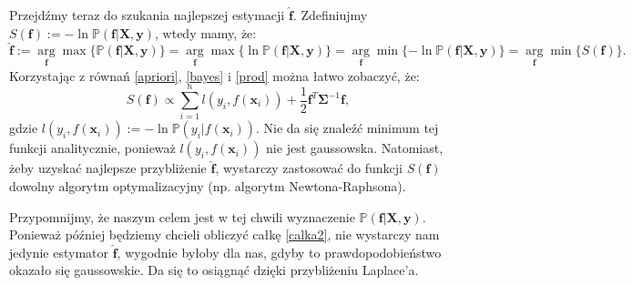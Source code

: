 \documentclass{mini}
\newcommand{\argmin}{\arg\!\min}
\newcommand{\argmax}{\arg\!\max}
\begin{document}
Przejdźmy teraz do szukania najlepszej estymacji $\mathbf{\hat{f}}$. Zdefiniujmy $S(\mathbf{f}) := -\ln\mathbb{P}(\mathbf{f}|\mathbf{X}, \mathbf{y})$, wtedy mamy, że: 
$$
\mathbf{\hat{f}} 
:= \underset{\mathbf{f}}\argmax \lbrace \mathbb{P}(\mathbf{f}|\mathbf{X}, \mathbf{y}) \rbrace 
= \underset{\mathbf{f}}\argmax \lbrace \ln\mathbb{P}(\mathbf{f}|\mathbf{X}, \mathbf{y}) \rbrace
= \underset{\mathbf{f}}\argmin \lbrace -\ln\mathbb{P}(\mathbf{f}|\mathbf{X}, \mathbf{y}) \rbrace
= \underset{\mathbf{f}}\argmin \lbrace S(\mathbf{f}) \rbrace.
$$
Korzystając z równań \eqref{apriori}, \eqref{bayes} i \eqref{prod} można łatwo zobaczyć, że:
$$
S(\mathbf{f}) \propto 
\sum_{i=1}^n\textit{l}(y_i, f(\mathbf{x}_i)) + \frac{1}{2}\mathbf{f}^T\mathbf{\Sigma}^{-1}\mathbf{f},
$$
gdzie $\textit{l}(y_i, f(\mathbf{x}_i)) := -\ln\mathbb{P}(y_i | f(\mathbf{x}_i))$.
Nie da się znaleźć minimum tej funkcji analitycznie, ponieważ $\textit{l}(y_i, f(\mathbf{x}_i))$ nie jest gaussowska. Natomiast, żeby uzyskać najlepsze przybliżenie $\mathbf{\hat{f}}$, wystarczy zastosować do funkcji $S(\mathbf{f})$ dowolny algorytm optymalizacyjny (np. algorytm Newtona-Raphsona).

Przypomnijmy, że naszym celem jest w tej chwili wyznaczenie $\mathbb{P}(\mathbf{f} | \textbf{X}, \textbf{y})$. Ponieważ później będziemy chcieli obliczyć całkę \eqref{calka2}, nie wystarczy nam jedynie estymator $\mathbf{\hat{f}}$, wygodnie byłoby dla nas, gdyby to prawdopodobieństwo okazało się gaussowskie. Da się to osiągnąć dzięki przybliżeniu Laplace'a. 
\end{document}
